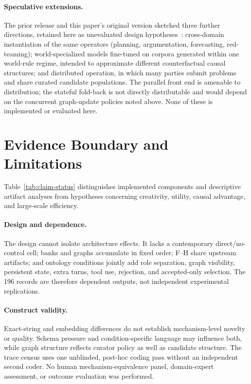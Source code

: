 \documentclass[11pt,a4paper]{article}
\begin{document}
\paragraph{Speculative extensions.} The prior release and this paper's original version sketched three further directions, retained here as unevaluated design hypotheses~\cite{westerberg2025strangeworlds}: cross-domain instantiation of the same operators (planning, argumentation, forecasting, red-teaming); world-specialized models fine-tuned on corpora generated within one world-rule regime, intended to approximate different counterfactual causal structures; and distributed operation, in which many parties submit problems and share curated candidate populations. The parallel front end is amenable to distribution; the stateful fold-back is not directly distributable and would depend on the concurrent graph-update policies noted above. None of these is implemented or evaluated here.

\section{Evidence Boundary and Limitations}
\label{sec:limits}

Table~\ref{tab:claim-status} distinguishes implemented components and descriptive artifact analyses from hypotheses concerning creativity, utility, causal advantage, and large-scale efficiency.

\paragraph{Design and dependence.} The design cannot isolate architecture effects. It lacks a contemporary direct/no-control cell; banks and graphs accumulate in fixed order; F--H share upstream artifacts; and ontology conditions jointly add role separation, graph visibility, persistent state, extra turns, tool use, rejection, and accepted-only selection. The 196 records are therefore dependent outputs, not independent experimental replications.

\paragraph{Construct validity.} Exact-string and embedding differences do not establish mechanism-level novelty or quality. Schema pressure and condition-specific language may influence both, while graph structure reflects curator policy as well as candidate structure. The trace census uses one unblinded, post-hoc coding pass without an independent second coder. No human mechanism-equivalence panel, domain-expert assessment, or outcome evaluation was performed.
\end{document}
